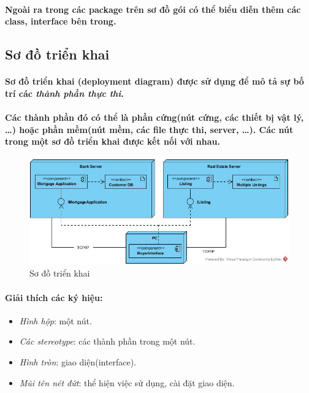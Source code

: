 \documentclass{article}
\begin{document}
  \paragraph{\textnormal{
    Ngoài ra trong các package trên sơ đồ gói có thể biểu diễn thêm các class, interface bên trong.
  }}

  \subsection{Sơ đồ triển khai}

  \paragraph{\textnormal{
    Sơ đồ triển khai (deployment diagram) được sử dụng để mô tả sự bố trí các \textit{thành phần thực thi}.
  }}

  \paragraph{\textnormal{
    Các thành phần đó có thể là phần cứng(nút cứng, các thiết bị vật lý, \ldots) hoặc phần mềm(nút mềm, các file thực thi, server, \ldots). Các nút trong một sơ đồ triển khai được kết nối với nhau.
  }}

  \begin{figure}[!ht]
    \centering
    \includegraphics[scale=0.5]{../pictures/diagrams/deployment/deployment-diagram-1.jpg}
    \caption{Sơ đồ triển khai}
  \end{figure}

  \paragraph{\textnormal{
    Giải thích các ký hiệu:
  }}
  \begin{itemize}
    \item \textit{Hình hộp}: một nút.
    \item \textit{Các stereotype}: các thành phần trong một nút.
    \item \textit{Hình tròn}: giao diện(interface).
    \item \textit{Mũi tên nét đứt}: thể hiện việc sử dụng, cài đặt giao diện.
  \end{itemize}
\end{document}
